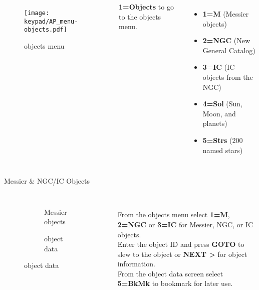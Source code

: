 \begin{frame}[t]{\insertsubsectionhead}
  \begin{columns}[T]
    \begin{figure}[h]
        \texttt{[image: keypad/AP\_menu-objects.pdf]}
      \caption{objects menu}
    \end{figure}
  \large
   \textbf{1=Objects} to go to the objects menu.\\[1ex]

    \begin{itemize}
        \item[] \textbf{1=M} (Messier objects)
        \item[] \textbf{2=NGC} (New General Catalog)
        \item[] \textbf{3=IC}   (IC objects from the NGC)
        \item[] \textbf{4=Sol}   (Sun, Moon, and planets)
        \item[] \textbf{5=Strs}  (200 named stars)
    \end{itemize}
\end{columns}
\end{frame}


\begin{frame}[t]{Messier \& NGC/IC Objects}
  \begin{columns}[T]
    \begin{figure}[ht]
        \begin{subfigure}{0.67\textwidth}
        \caption{Messier objects}
      \end{subfigure}
      \vspace{\fill}
      \begin{subfigure}{0.67\textwidth}
        \caption{object data}
      \end{subfigure}
    \end{figure}
  \large
  \ \\[0.25ex]
  From the objects menu select \textbf{1=M}, \textbf{2=NGC} or \textbf{3=IC}
  for Messier, NGC, or IC objects.\\[1ex]

  Enter the object ID and press \textbf{GOTO} to slew to the object or
  \textbf{NEXT \textgreater} for object information. \\[1ex]

  From the object data screen select \textbf{5=BkMk} to bookmark for
  later use.
\end{columns}
\end{frame}

